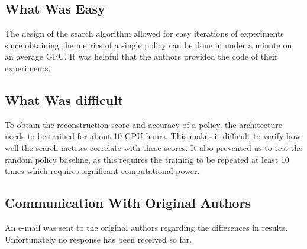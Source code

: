 \subsection*{What Was Easy}
The design of the search algorithm allowed for easy iterations of experiments since obtaining the metrics of a single policy can be done in under a minute on an average GPU. It was helpful that the authors provided the code of their experiments.

\subsection*{What Was difficult}
To obtain the reconstruction score and accuracy of a policy, the architecture needs to be trained for about 10 GPU-hours. This makes it difficult to verify how well the search metrics correlate with these scores. It also prevented us to test the random policy baseline, as this requires the training to be repeated at least 10 times which requires significant computational power.

\subsection*{Communication With Original Authors}
An e-mail was sent to the original authors regarding the differences in results. Unfortunately no response has been received so far.


